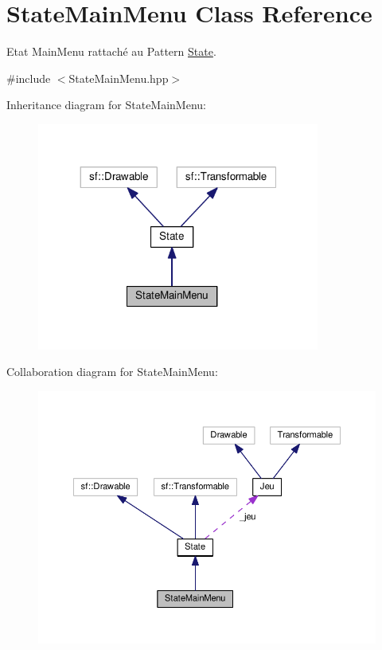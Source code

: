 \hypertarget{class_state_main_menu}{\section{State\+Main\+Menu Class Reference}
\label{class_state_main_menu}
}


Etat Main\+Menu rattaché au Pattern \hyperlink{class_state}{State}.  




{\ttfamily \#include $<$State\+Main\+Menu.\+hpp$>$}



Inheritance diagram for State\+Main\+Menu\+:
\nopagebreak
\begin{figure}[H]
\begin{center}
\leavevmode
\includegraphics[width=263pt]{class_state_main_menu__inherit__graph}
\end{center}
\end{figure}


Collaboration diagram for State\+Main\+Menu\+:
\nopagebreak
\begin{figure}[H]
\begin{center}
\leavevmode
\includegraphics[width=350pt]{class_state_main_menu__coll__graph}
\end{center}
\end{figure}
